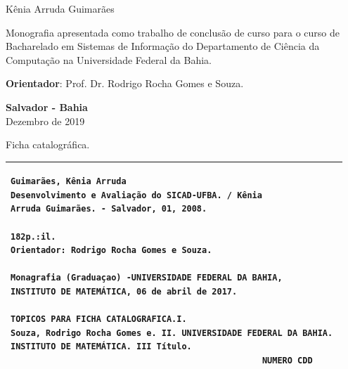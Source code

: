 \documentclass[12pt, a4paper]{report}
\begin{document}
\newpage
\begin{center}

\vspace{4cm}

\large{Kênia Arruda Guimarães}
\end{center}

\vspace{4cm}

\begin{flushright}
\begin{minipage}{8.6cm}
Monografia apresentada como trabalho de conclusão de curso para o curso de Bacharelado em Sistemas de Informação do Departamento de Ciência da Computação na Universidade Federal da Bahia.

\vspace{0.5cm}
\textbf{Orientador}: Prof. Dr. Rodrigo Rocha Gomes e Souza.

\end{minipage}
\end{flushright}
 
\vspace{8cm}


\begin{center}
\textbf{Salvador - Bahia} \\
Dezembro de 2019
\end{center}

\presentationpage

\newpage
\thispagestyle{empty}
\null\vfill
                  
\begin{center}
 Ficha catalográfica.
\begin{tabular}{|p{13.5cm}|}%
\hline
\begin{small}
\begin{verbatim}
Guimarães, Kênia Arruda
Desenvolvimento e Avaliação do SICAD-UFBA. / Kênia
Arruda Guimarães. - Salvador, 01, 2008.

182p.:il.
Orientador: Rodrigo Rocha Gomes e Souza.

Monagrafia (Graduaçao) -UNIVERSIDADE FEDERAL DA BAHIA,
INSTITUTO DE MATEMÁTICA, 06 de abril de 2017.

TOPICOS PARA FICHA CATALOGRAFICA.I. 
Souza, Rodrigo Rocha Gomes e. II. UNIVERSIDADE FEDERAL DA BAHIA. 
INSTITUTO DE MATEMÁTICA. III Título.
                                                  NUMERO CDD
\end{verbatim}
\end{small}
\\ \hline
\end{tabular}
\end{center}
\setcounter{page}{2} %
\end{document}
